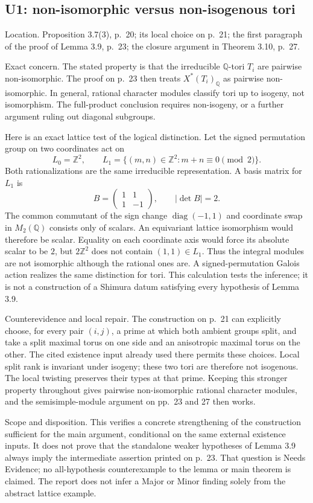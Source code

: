 \documentclass[10pt]{article}
\begin{document}
\subsection*{U1: non-isomorphic versus non-isogenous tori}
Location. Proposition 3.7(3), p. 20; its local choice on p. 21; the first paragraph of the proof of Lemma 3.9, p. 23; the closure argument in Theorem 3.10, p. 27.\par
Exact concern. The stated property is that the irreducible \(\mathbb Q\)-tori \(T_i\) are pairwise non-isomorphic. The proof on p. 23 then treats \(X^*(T_i)_\mathbb Q\) as pairwise non-isomorphic. In general, rational character modules classify tori up to isogeny, not isomorphism. The full-product conclusion requires non-isogeny, or a further argument ruling out diagonal subgroups.\par
Here is an exact lattice test of the logical distinction. Let the signed permutation group on two coordinates act on \[L_0=\mathbb Z^2,\qquad
 L_1=\{(m,n)\in\mathbb Z^2:m+n\equiv0\pmod2\}.\] Both rationalizations are the same irreducible representation. A basis matrix for \(L_1\) is \[B=\begin{pmatrix}1&1\\1&-1\end{pmatrix},\qquad |\det B|=2.\] The common commutant of the sign change \(\operatorname{diag}(-1,1)\) and coordinate swap in \(M_2(\mathbb Q)\) consists only of scalars. An equivariant lattice isomorphism would therefore be scalar. Equality on each coordinate axis would force its absolute scalar to be \(2\), but \(2\mathbb Z^2\) does not contain \((1,1)\in L_1\). Thus the integral modules are not isomorphic although the rational ones are. A signed-permutation Galois action realizes the same distinction for tori. This calculation tests the inference; it is not a construction of a Shimura datum satisfying every hypothesis of Lemma 3.9.\par
Counterevidence and local repair. The construction on p. 21 can explicitly choose, for every pair \((i,j)\), a prime at which both ambient groups split, and take a split maximal torus on one side and an anisotropic maximal torus on the other. The cited existence input already used there permits these choices. Local split rank is invariant under isogeny; these two tori are therefore not isogenous. The local twisting preserves their types at that prime. Keeping this stronger property throughout gives pairwise non-isomorphic rational character modules, and the semisimple-module argument on pp. 23 and 27 then works.\par
Scope and disposition. This verifies a concrete strengthening of the construction sufficient for the main argument, conditional on the same external existence inputs. It does not prove that the standalone weaker hypotheses of Lemma 3.9 always imply the intermediate assertion printed on p. 23. That question is Needs Evidence; no all-hypothesis counterexample to the lemma or main theorem is claimed. The report does not infer a Major or Minor finding solely from the abstract lattice example.\par
\end{document}

